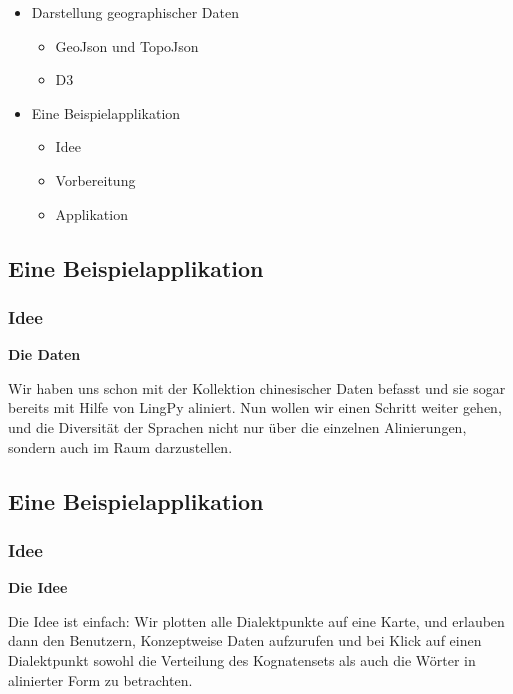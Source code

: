\begin{itemize}
\itemsep1pt\parskip0pt
\item
  {Darstellung geographischer Daten}

  \begin{itemize}
  \itemsep1pt\parskip0pt
  \item
    {GeoJson und TopoJson}
  \item
    {D3}
  \end{itemize}
\item
  {Eine Beispielapplikation}

  \begin{itemize}
  \itemsep1pt\parskip0pt
  \item
    {Idee}
  \item
    {Vorbereitung}
  \item
    {Applikation}
  \end{itemize}
\end{itemize}

\subsection{\texorpdfstring{{Eine
Beispielapplikation}}{Eine Beispielapplikation}}

\subsubsection{\texorpdfstring{{Idee}}{Idee}}

\textbf{Die Daten}

Wir haben uns schon mit der Kollektion chinesischer Daten befasst und
sie sogar bereits mit Hilfe von LingPy aliniert. Nun wollen wir einen
Schritt weiter gehen, und die Diversität der Sprachen nicht nur über die
einzelnen Alinierungen, sondern auch im Raum darzustellen.

\subsection{\texorpdfstring{{Eine
Beispielapplikation}}{Eine Beispielapplikation}}

\subsubsection{\texorpdfstring{{Idee}}{Idee}}

\textbf{Die Idee}

Die Idee ist einfach: Wir plotten alle Dialektpunkte auf eine Karte, und
erlauben dann den Benutzern, Konzeptweise Daten aufzurufen und bei Klick
auf einen Dialektpunkt sowohl die Verteilung des Kognatensets als auch
die Wörter in alinierter Form zu betrachten.

